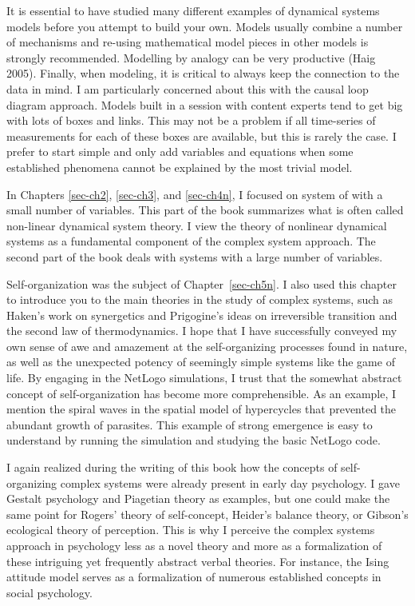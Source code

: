 \documentclass[
  a4paper,
  DIV=11,
  numbers=noendperiod,
  oneside]{scrreprt}
\begin{document}
It is essential to have studied many different examples of dynamical
systems models before you attempt to build your own. Models usually
combine a number of mechanisms and re-using mathematical model pieces in
other models is strongly recommended. Modelling by analogy can be very
productive (Haig 2005). Finally, when modeling, it is critical to always
keep the connection to the data in mind. I am particularly concerned
about this with the causal loop diagram approach. Models built in a
session with content experts tend to get big with lots of boxes and
links. This may not be a problem if all time-series of measurements for
each of these boxes are available, but this is rarely the case. I prefer
to start simple and only add variables and equations when some
established phenomena cannot be explained by the most trivial model.

In Chapters \ref{sec-ch2}, \ref{sec-ch3}, and \ref{sec-ch4n}, I focused
on system of with a small number of variables. This part of the book
summarizes what is often called non-linear dynamical system theory. I
view the theory of nonlinear dynamical systems as a fundamental
component of the complex system approach. The second part of the book
deals with systems with a large number of variables.

Self-organization was the subject of Chapter~\ref{sec-ch5n}. I also used
this chapter to introduce you to the main theories in the study of
complex systems, such as Haken's work on synergetics and Prigogine's
ideas on irreversible transition and the second law of thermodynamics. I
hope that I have successfully conveyed my own sense of awe and amazement
at the self-organizing processes found in nature, as well as the
unexpected potency of seemingly simple systems like the game of life. By
engaging in the NetLogo simulations, I trust that the somewhat abstract
concept of self-organization has become more comprehensible. As an
example, I mention the spiral waves in the spatial model of hypercycles
that prevented the abundant growth of parasites. This example of strong
emergence is easy to understand by running the simulation and studying
the basic NetLogo code.

I again realized during the writing of this book how the concepts of
self-organizing complex systems were already present in early day
psychology. I gave Gestalt psychology and Piagetian theory as examples,
but one could make the same point for Rogers' theory of self-concept,
Heider's balance theory, or Gibson's ecological theory of perception.
This is why I perceive the complex systems approach in psychology less
as a novel theory and more as a formalization of these intriguing yet
frequently abstract verbal theories. For instance, the Ising attitude
model serves as a formalization of numerous established concepts in
social psychology.
\end{document}
